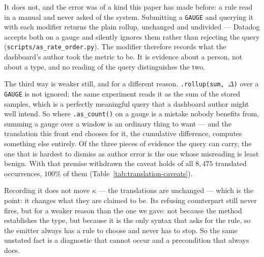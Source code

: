\begin{remark}
It does not, and the error was of a kind this paper has made before: a rule read in a
manual and never asked of the system. Submitting a \texttt{GAUGE} and querying it with
each modifier returns the plain rollup, unchanged and undivided --- Datadog accepts both
on a gauge and silently ignores them rather than rejecting the query
(\texttt{scripts\slash as\_rate\_order.py}). The modifier therefore records what the
dashboard's author took the metric to be. It is evidence about a person, not about a
type, and no reading of the query distinguishes the two.

The third way is weaker still, and for a different reason. \texttt{.rollup(sum, $\Delta$)}
over a \texttt{GAUGE} is not ignored: the same experiment reads it as the sum of the
stored samples, which is a perfectly meaningful query that a dashboard author might well
intend. So where \texttt{.as\_count()} on a gauge is a mistake nobody benefits from,
summing a gauge over a window is an ordinary thing to want --- and the translation this
front end chooses for it, the cumulative difference, computes something else entirely.
Of the three pieces of evidence the query can carry, the one that is hardest to dismiss
as author error is the one whose misreading is least benign. With that premise withdrawn the
caveat holds of all $8{,}475$ translated occurrences, $100\%$ of them
(Table~\ref{tab:translation-caveats}).

Recording it does not move $\kappa$ --- the translations are unchanged --- which is the
point: it changes what they are claimed to be. Its refusing counterpart still never fires,
but for a weaker reason than the one we gave: not because the method establishes the type,
but because it is the only syntax that asks for the rule, so the emitter always has a rule
to choose and never has to stop. So the same unstated fact is a diagnostic that cannot
occur and a precondition that always does.
\end{remark}
